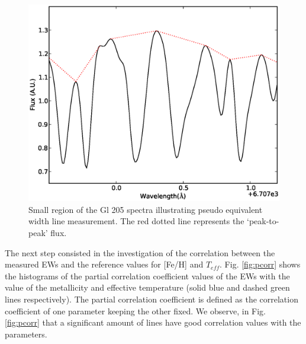 \documentclass{aa}
\begin{document}
\begin{figure}[h]
\begin{center}
\includegraphics[scale=0.45]{pics/template.eps}
\end{center}
\caption{Small region of the Gl 205 spectra illustrating pseudo equivalent width line measurement. The red dotted line represents the `peak-to-peak' flux.}
\label{fig:spec}
\end{figure}

The next step consisted in the investigation of the correlation between the measured EWs and the reference values for [Fe/H] and $T_{eff}$. Fig. \ref{fig:pcorr} shows the histograms of the partial correlation coefficient values of the EWs with the value of the metallicity and effective temperature (solid blue and dashed green lines respectively). The partial correlation coefficient is defined as the correlation coefficient of one parameter keeping the other fixed. %
We observe, in Fig. \ref{fig:pcorr} that a significant amount of lines have good correlation values with the parameters. 
\end{document}
